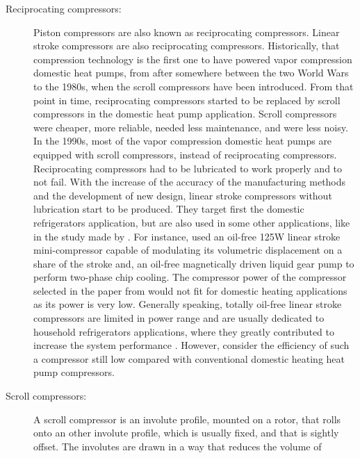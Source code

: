 \begin{description}
\item[Reciprocating compressors:] Piston compressors are also known as
  reciprocating compressors. Linear stroke compressors are also
  reciprocating compressors. Historically, that compression technology
  is the first one to have powered vapor compression domestic heat
  pumps, from after somewhere between the two World Wars
  \citep[p.\,23]{zogg-2008a} to the 1980s, when the scroll compressors
  have been introduced. From that point in time, reciprocating
  compressors started to be replaced by scroll compressors in the
  domestic heat pump application. Scroll compressors were cheaper,
  more reliable, needed less maintenance, and were less noisy. In the
  1990s, most of the vapor compression domestic heat pumps are
  equipped with scroll compressors, instead of reciprocating
  compressors. Reciprocating compressors had to be lubricated to work
  properly and to not fail. With the increase of the accuracy of the
  manufacturing methods and the development of new design, linear
  stroke compressors without lubrication start to be produced. They
  target first the domestic refrigerators application, but are also
  used in some other applications, like in the study made by
  \citet{Marcinichen-Michel-2014a}. For instance,
  \citet{Marcinichen-Michel-2014a} used an oil-free 125W
  \citep[Tab.\,1, p.\,183]{Marcinichen-Michel-2014a} linear stroke
  mini-compressor capable of modulating its volumetric displacement on
  a share of the stroke \citep[p.\,183]{Marcinichen-Michel-2014a} and,
  an oil-free magnetically driven liquid gear pump to perform
  two-phase chip cooling. The compressor power of the compressor
  selected in the paper from \citet{Marcinichen-Michel-2014a} would
  not fit for domestic heating applications as its power is very
  low. Generally speaking, totally oil-free linear stroke compressors
  are limited in power range and are usually dedicated to household
  refrigerators applications, where they greatly contributed to
  increase the system performance
  \citep{Bansal-Abdelaziz-2011a}. However,
  \citet[p.\,186]{Marcinichen-Michel-2014a} consider the efficiency of
  such a compressor still low compared with conventional domestic
  heating heat pump compressors.
\item[Scroll compressors:]\label{sec:sota-scroll}A scroll compressor
  is an involute profile, mounted on a rotor, that rolls onto an other
  involute profile, which is usually fixed, and that is sightly
  offset. The involutes are drawn in a way that reduces the volume of

\end{description}
